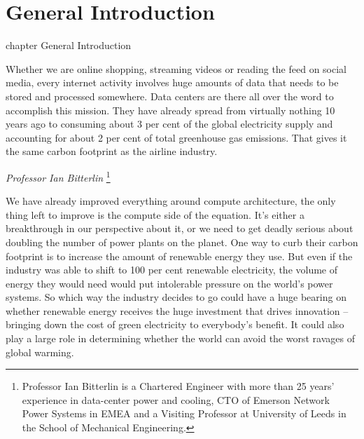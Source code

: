 
\chapter*{General Introduction}  {chapter} {General Introduction}


Whether we are online shopping, streaming videos or reading the feed on social media, every
internet activity involves huge amounts of data that needs to be stored and processed
somewhere. Data centers are there all over the word to accomplish this mission. They have
already spread from virtually nothing 10 years ago to consuming about 3 per cent of the
global electricity supply and accounting for about 2 per cent of total greenhouse gas
emissions. That gives it the same carbon footprint as the airline industry\cite{consumption-stats}.

\vspace{1cm}

\begin{flushright}
    \textit{Professor Ian Bitterlin}
    \footnote{
        Professor Ian Bitterlin is a Chartered Engineer with more than 25 years’ experience
        in data-center power and cooling, CTO of Emerson Network Power Systems in EMEA
        and a Visiting Professor at University of Leeds in the School of Mechanical Engineering.
    }
\end{flushright}
\vspace{0.5cm}

We have already improved everything around compute architecture, the only thing left to improve
is the compute side of the equation. It’s either a breakthrough in our perspective about it, or we
need to get deadly serious about doubling the number of power plants on the planet.
One way to curb their carbon footprint is to increase the amount of renewable energy they
use. But even if the industry was able to shift to 100 per cent renewable electricity, the volume
of energy they would need would put intolerable pressure on the world’s power systems.
So which way the industry decides to go could have a huge bearing on whether renewable energy
receives the huge investment that drives innovation – bringing down the cost of green electricity
to everybody’s benefit. It could also play a large role in determining whether the world can
avoid the worst ravages of global warming.

